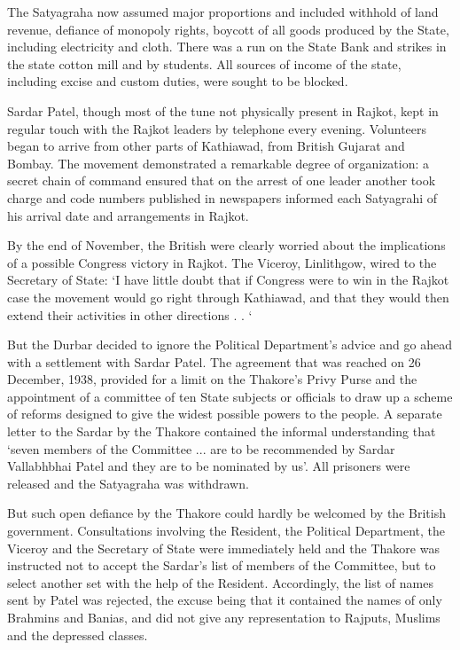 \begin{multicols}{2}
The Satyagraha now assumed major proportions and included withhold of land revenue, defiance of monopoly rights, boycott of all goods produced by the State, including electricity and cloth. There was a run on the State Bank and strikes in the state cotton mill and by students. All sources of income of the state, including excise and custom duties, were sought to be blocked. 

Sardar Patel, though most of the tune not physically present in Rajkot, kept in regular touch with the Rajkot leaders by telephone every evening. Volunteers began to arrive from other parts of Kathiawad, from British Gujarat and Bombay. The movement demonstrated a remarkable degree of organization: a secret chain of command ensured that on the arrest of one leader another took charge and code numbers published in newspapers informed each Satyagrahi of his arrival date and arrangements in Rajkot. 

By the end of November, the British were clearly worried about the implications of a possible Congress victory in Rajkot. The Viceroy, Linlithgow, wired to the Secretary of State: `I have little doubt that if Congress were to win in the Rajkot case the movement would go right through Kathiawad, and that they would then extend their activities in other directions . . ` 

But the Durbar decided to ignore the Political Department's advice and go ahead with a settlement with Sardar Patel. The agreement that was reached on 26 December, 1938, provided for a limit on the Thakore's Privy Purse and the appointment of a committee of ten State subjects or officials to draw up a scheme of reforms designed to give the widest possible powers to the people. A separate letter to the Sardar by the Thakore contained the informal understanding that `seven members of the Committee ... are to be recommended by Sardar Vallabhbhai Patel and they are to be nominated by us'. All prisoners were released and the Satyagraha was withdrawn. 

But such open defiance by the Thakore could hardly be welcomed by the British government. Consultations involving the Resident, the Political Department, the Viceroy and the Secretary of State were immediately held and the Thakore was instructed not to accept the Sardar's list of members of the Committee, but to select another set with the help of the Resident. Accordingly, the list of names sent by Patel was rejected, the excuse being that it contained the names of only Brahmins and Banias, and did not give any representation to Rajputs, Muslims and the depressed classes. 


\end{multicols}
